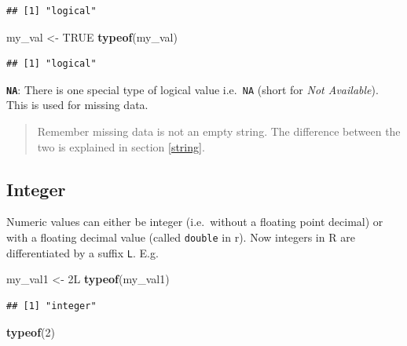 \documentclass[
]{book}
\newenvironment{Shaded}{\begin{snugshade}}{\end{snugshade}}
\newcommand{\ConstantTok}[1]{\textcolor[rgb]{0.56,0.35,0.01}{#1}}
\newcommand{\DecValTok}[1]{\textcolor[rgb]{0.00,0.00,0.81}{#1}}
\newcommand{\FunctionTok}[1]{\textcolor[rgb]{0.13,0.29,0.53}{\textbf{#1}}}
\newcommand{\NormalTok}[1]{#1}
\newcommand{\OtherTok}[1]{\textcolor[rgb]{0.56,0.35,0.01}{#1}}
\begin{document}
\begin{verbatim}
## [1] "logical"
\end{verbatim}

\begin{Shaded}
\begin{Highlighting}[]
\NormalTok{my\_val }\OtherTok{\textless{}{-}} \ConstantTok{TRUE}
\FunctionTok{typeof}\NormalTok{(my\_val)}
\end{Highlighting}
\end{Shaded}

\begin{verbatim}
## [1] "logical"
\end{verbatim}

\textbf{\texttt{NA}}: There is one special type of logical value i.e.~\texttt{NA} (short for \emph{Not Available}). This is used for missing data.

\begin{quote}
Remember missing data is not an empty string. The difference between the two is explained in section \ref{string}.
\end{quote}

\hypertarget{integer}{%
\subsection{Integer}\label{integer}}

Numeric values can either be integer (i.e.~without a floating point decimal) or with a floating decimal value (called \texttt{double} in r). Now integers in R are differentiated by a suffix \texttt{L}. E.g.

\begin{Shaded}
\begin{Highlighting}[]
\NormalTok{my\_val1 }\OtherTok{\textless{}{-}}\NormalTok{ 2L}
\FunctionTok{typeof}\NormalTok{(my\_val1)}
\end{Highlighting}
\end{Shaded}

\begin{verbatim}
## [1] "integer"
\end{verbatim}

\begin{Shaded}
\begin{Highlighting}[]
\FunctionTok{typeof}\NormalTok{(}\DecValTok{2}\NormalTok{)}
\end{Highlighting}
\end{Shaded}
\end{document}
